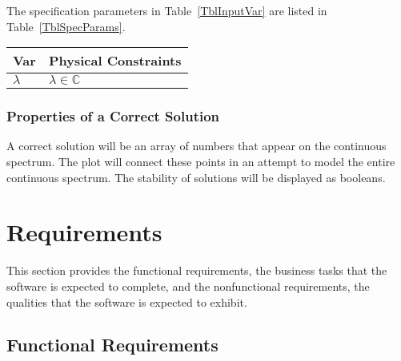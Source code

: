 \documentclass[12pt]{article}
\begin{document}
The specification parameters in Table~\ref{TblInputVar} are listed in
Table~\ref{TblSpecParams}.

\begin{table}[!h]
\caption{Output Variables} \label{TblOutputVar}
\renewcommand{\arraystretch}{1.2}
\noindent \begin{longtable*}{l l} 
  \toprule
  \textbf{Var} & \textbf{Physical Constraints} \\
  \midrule 
  $\lambda$ & $\lambda \in \mathbb{C}$ 
  \\
  \bottomrule
\end{longtable*}
\end{table}

\subsubsection{Properties of a Correct Solution} \label{sec_CorrectSolution}

\noindent
A correct solution will be an array of numbers that appear on the continuous 
spectrum. The plot will connect these points in an attempt to model the entire 
continuous spectrum. The stability of solutions will be displayed as booleans. 

\section{Requirements}

This section provides the functional requirements, the business tasks that the
software is expected to complete, and the nonfunctional requirements, the
qualities that the software is expected to exhibit.\\


\subsection{Functional Requirements}
\end{document}
